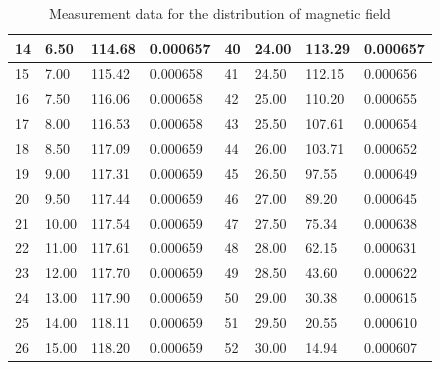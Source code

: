 \documentclass[12pt, a4paper]{article}
\begin{document}
\begin{table}[H]
\begin{center}
\begin{tabular}{|l|l|l|l|l|l|l|l|}
	14 & 6.50                          & 114.68      & 0.000657     & 40 & 24.00                         & 113.29      & 0.000657     \\ \hline
	15 & 7.00                          & 115.42      & 0.000658     & 41 & 24.50                         & 112.15      & 0.000656     \\ \hline
	16 & 7.50                          & 116.06      & 0.000658     & 42 & 25.00                         & 110.20      & 0.000655     \\ \hline
	17 & 8.00                          & 116.53      & 0.000658     & 43 & 25.50                         & 107.61      & 0.000654     \\ \hline
	18 & 8.50                          & 117.09      & 0.000659     & 44 & 26.00                         & 103.71      & 0.000652     \\ \hline
	19 & 9.00                          & 117.31      & 0.000659     & 45 & 26.50                         & 97.55       & 0.000649     \\ \hline
	20 & 9.50                          & 117.44      & 0.000659     & 46 & 27.00                         & 89.20       & 0.000645     \\ \hline
	21 & 10.00                         & 117.54      & 0.000659     & 47 & 27.50                         & 75.34       & 0.000638     \\ \hline
	22 & 11.00                         & 117.61      & 0.000659     & 48 & 28.00                         & 62.15       & 0.000631     \\ \hline
	23 & 12.00                         & 117.70      & 0.000659     & 49 & 28.50                         & 43.60       & 0.000622     \\ \hline
	24 & 13.00                         & 117.90      & 0.000659     & 50 & 29.00                         & 30.38       & 0.000615     \\ \hline
	25 & 14.00                         & 118.11      & 0.000659     & 51 & 29.50                         & 20.55       & 0.000610     \\ \hline
	26 & 15.00                         & 118.20      & 0.000659     & 52 & 30.00                         & 14.94       & 0.000607     \\ \hline
	\end{tabular}
	\caption{Measurement data for the distribution of magnetic field}		
	\end{center}
\end{table}
\end{document}
